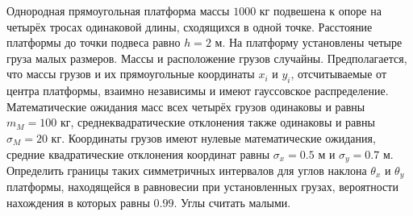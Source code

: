 Однородная прямоугольная платформа массы $1000$ кг подвешена к опоре
на четырёх тросах одинаковой длины, сходящихся в одной точке.
Расстояние платформы до точки подвеса равно $h = 2$ м.
На платформу установлены четыре груза малых размеров.
Массы и расположение грузов случайны.
Предполагается, что массы грузов и их прямоугольные координаты
$x_i$ и $y_i$, отсчитываемые от центра платформы, взаимно независимы
и имеют гауссовское распределение.
Математические ожидания масс всех четырёх грузов одинаковы
и равны $m_M = 100$ кг, среднеквадратические отклонения также одинаковы
и равны $\sigma _M = 20$ кг.
Координаты грузов имеют нулевые математические ожидания,
средние квадратические отклонения координат равны $\sigma _x = 0.5$ м
и $\sigma _y = 0.7$ м.
Определить границы таких симметричных интервалов для углов наклона
$\theta _x$ и $\theta _y$ платформы, находящейся в равновесии
при установленных грузах, вероятности нахождения в которых равны $0.99$.
Углы считать малыми.
